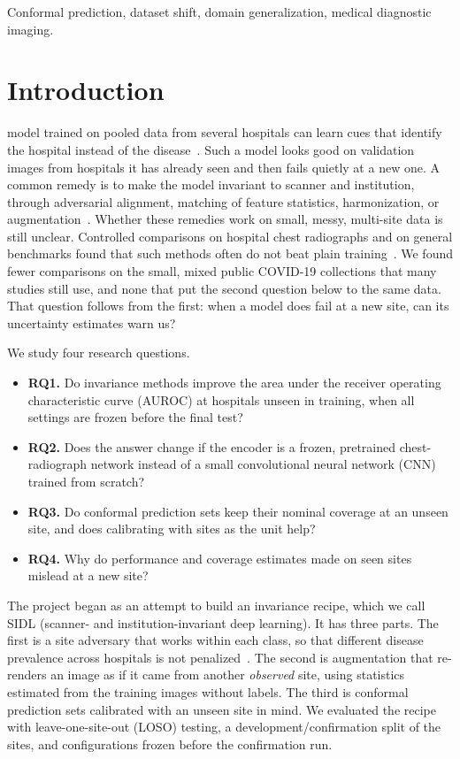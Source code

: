 \documentclass[journal]{IEEEtran}
\begin{document}
\begin{IEEEkeywords}
Conformal prediction, dataset shift, domain generalization, medical diagnostic imaging.
\end{IEEEkeywords}

\section{Introduction}
 model trained on pooled data from several hospitals can learn cues that identify the hospital instead of the disease~\cite{zech2018variable,degrave2021ai,geirhos2020shortcut}. Such a model looks good on validation images from hospitals it has already seen and then fails quietly at a new one. A common remedy is to make the model invariant to scanner and institution, through adversarial alignment, matching of feature statistics, harmonization, or augmentation~\cite{ganin2016domain,sun2016deep,zhang2020generalizing,johnson2007adjusting}. Whether these remedies work on small, messy, multi-site data is still unclear. Controlled comparisons on hospital chest radiographs and on general benchmarks found that such methods often do not beat plain training~\cite{zhang2021empirical,gulrajani2021in}. We found fewer comparisons on the small, mixed public COVID-19 collections that many studies still use, and none that put the second question below to the same data. That question follows from the first: when a model does fail at a new site, can its uncertainty estimates warn us?

We study four research questions.
\begin{itemize}\setlength\itemsep{0pt}
  \item \textbf{RQ1.} Do invariance methods improve the area under the receiver operating characteristic curve (AUROC) at hospitals unseen in training, when all settings are frozen before the final test?
  \item \textbf{RQ2.} Does the answer change if the encoder is a frozen, pretrained chest-radiograph network instead of a small convolutional neural network (CNN) trained from scratch?
  \item \textbf{RQ3.} Do conformal prediction sets keep their nominal coverage at an unseen site, and does calibrating with sites as the unit help?
  \item \textbf{RQ4.} Why do performance and coverage estimates made on seen sites mislead at a new site?
\end{itemize}

The project began as an attempt to build an invariance recipe, which we call SIDL (scanner- and institution-invariant deep learning). It has three parts. The first is a site adversary that works within each class, so that different disease prevalence across hospitals is not penalized~\cite{zhao2019learning}. The second is augmentation that re-renders an image as if it came from another \emph{observed} site, using statistics estimated from the training images without labels. The third is conformal prediction sets calibrated with an unseen site in mind. We evaluated the recipe with leave-one-site-out (LOSO) testing, a development/confirmation split of the sites, and configurations frozen before the confirmation run.
\end{document}
